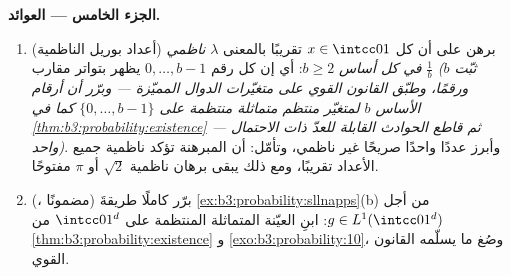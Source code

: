 \begin{problem}
\medskip
\noindent\textbf{الجزء الخامس --- العوائد.}
\begin{enumerate}[resume]
  \item (أعداد بوريل الناظمية) برهن على أن كل $x \in \intcc01$
        تقريبًا بالمعنى $\lambda$ \emph{ناظمي في كل أساس}
        $b \geq 2$: أي إن كل رقم $0, \dots, b-1$ يظهر بتواتر
        مقارب $\frac1b$ \emph{(ثبّت $b$ ورقمًا، وطبّق القانون
        القوي على متغيّرات الدوال المميّزة --- وبرّر أن أرقام
        الأساس $b$ لمتغيّر منتظم  متماثلة منتظمة على
        $\{0,\dots,b-1\}$ كما في \cref{thm:b3:probability:existence} --- ثم قاطع الحوادث القابلة للعدّ
        ذات الاحتمال واحد)}. وأبرز عددًا واحدًا صريحًا غير
        ناظمي، وتأمّل: أن المبرهنة تؤكد ناظمية جميع الأعداد
        تقريبًا، ومع ذلك يبقى برهان ناظمية $\sqrt2$ أو $\pi$
        مفتوحًا.
  \item (، مضمونًا) برّر كاملًا طريقةَ \cref{ex:b3:probability:sllnapps}(b)
        من أجل $g \in L^1(\intcc01^d)$: ابنِ العيّنة  المتماثلة
        المنتظمة على $\intcc01^d$ من \cref{thm:b3:probability:existence} و \cref{exo:b3:probability:10}،
        وصُغ ما يسلّمه القانون القوي.
\end{enumerate}


\end{problem}
